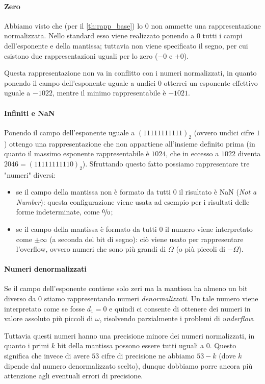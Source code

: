 \paragraph{Zero} Abbiamo visto che (per il \autoref{th:rapp_base}) lo $0$ non ammette una rappresentazione normalizzata. Nello standard \IEEE esso viene realizzato ponendo a $0$ tutti i campi dell'esponente e della mantissa; tuttavia non viene specificato il segno, per cui esistono due rappresentazioni uguali per lo zero ($-0$ e $+0$). 

Questa rappresentazione non va in conflitto con i numeri normalizzati, in quanto ponendo il campo dell'esponente uguale a undici $0$ otterrei un esponente effettivo uguale a $-1022$, mentre il minimo rappresentabile è $-1021$. 

\paragraph{Infiniti e NaN} Ponendo il campo dell'esponente uguale a $(11111111111)_2$ (ovvero undici cifre $1$) ottengo una rappresentazione che non appartiene all'insieme definito prima (in quanto il massimo esponente rappresentabile è $1024$, che in eccesso a $1022$ diventa $2046 = (11111111110)_2$). Sfruttando questo fatto possiamo rappresentare tre "numeri" diversi:
\begin{itemize}
    \item se il campo della mantissa non è formato da tutti $0$ il risultato è NaN (\emph{Not a Number}): questa configurazione viene usata ad esempio per i risultati delle forme indeterminate, come $\nicefrac00$;
    \item se il campo della mantissa è formato da tutti $0$ il numero viene interpretato come $\pm\infty$ (a seconda del bit di segno): ciò viene usato per rappresentare l'overflow, ovvero numeri che sono più grandi di $\Omega$ (o più piccoli di $-\Omega$). 
\end{itemize} 

\paragraph{Numeri denormalizzati} Se il campo dell'esponente contiene solo zeri ma la mantissa ha almeno un bit diverso da $0$ stiamo rappresentando numeri \emph{denormalizzati}. Un tale numero viene interpretato come se fosse $d_1 = 0$ e quindi ci consente di ottenere dei numeri in valore assoluto più piccoli di $\omega$, risolvendo parzialmente i problemi di \emph{underflow}. 

Tuttavia questi numeri hanno una precisione minore dei numeri normalizzati, in quanto i primi $k$ bit della mantissa possono essere tutti uguali a $0$. Questo significa che invece di avere $53$ cifre di precisione ne abbiamo $53 - k$ (dove $k$ dipende dal numero denormalizzato scelto), dunque dobbiamo porre ancora più attenzione agli eventuali errori di precisione.